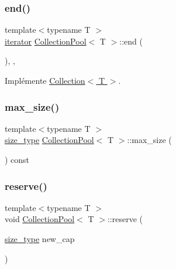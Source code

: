 \mbox{\label{class_collection_pool_a870a85422595d6533688704ebe43b520}} 
\subsubsection{\texorpdfstring{end()}{end()}}
{\footnotesize\ttfamily template$<$typename T $>$ \\
\hyperlink{class_collection_a317dca4fdf1eb2e47643bb60c620f802}{iterator} \hyperlink{class_collection_pool}{Collection\+Pool}$<$ T $>$\+::end (\begin{DoxyParamCaption}{ }\end{DoxyParamCaption})\hspace{0.3cm}{\ttfamily [inline]}, {\ttfamily [override]}, {\ttfamily [virtual]}}



Implémente \hyperlink{class_collection_ab5b98f651d0f49cde1be067c69c52e89}{Collection$<$ T $>$}.

\mbox{\label{class_collection_pool_a333a1edf4c98229f47b698463baf0324}} 
\subsubsection{\texorpdfstring{max\+\_\+size()}{max\_size()}}
{\footnotesize\ttfamily template$<$typename T $>$ \\
\hyperlink{class_collection_a3f8b024f587aa20be530866da30948c4}{size\+\_\+type} \hyperlink{class_collection_pool}{Collection\+Pool}$<$ T $>$\+::max\+\_\+size (\begin{DoxyParamCaption}{ }\end{DoxyParamCaption}) const\hspace{0.3cm}{\ttfamily [inline]}}

\mbox{\label{class_collection_pool_a06334969f57ca768241af598f03e8de1}} 
\subsubsection{\texorpdfstring{reserve()}{reserve()}}
{\footnotesize\ttfamily template$<$typename T $>$ \\
void \hyperlink{class_collection_pool}{Collection\+Pool}$<$ T $>$\+::reserve (\begin{DoxyParamCaption}\item[{\hyperlink{class_collection_a3f8b024f587aa20be530866da30948c4}{size\+\_\+type}}]{new\+\_\+cap }\end{DoxyParamCaption})\hspace{0.3cm}{\ttfamily [inline]}}

